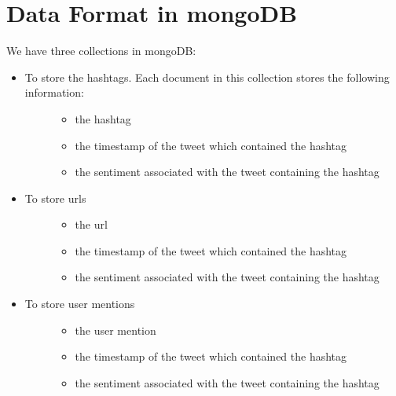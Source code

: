 \documentclass[letterpaper,10pt,english]{sphinxmanual}
\begin{document}
\section{Data Format in mongoDB}
\label{\detokenize{mongoDB_data_ingestion:data-format-in-mongodb}}
We have three collections in mongoDB:
\begin{itemize}
\item {} \begin{description}
\item[{To store the hashtags. Each document in this collection stores the following information:}] \leavevmode\begin{itemize}
\item {} 
the hashtag

\item {} 
the timestamp of the tweet which contained the hashtag

\item {} 
the sentiment associated with the tweet containing the hashtag

\end{itemize}

\end{description}

\item {} \begin{description}
\item[{To store urls}] \leavevmode\begin{itemize}
\item {} 
the url

\item {} 
the timestamp of the tweet which contained the hashtag

\item {} 
the sentiment associated with the tweet containing the hashtag

\end{itemize}

\end{description}

\item {} \begin{description}
\item[{To store user mentions}] \leavevmode\begin{itemize}
\item {} 
the user mention

\item {} 
the timestamp of the tweet which contained the hashtag

\item {} 
the sentiment associated with the tweet containing the hashtag

\end{itemize}

\end{description}

\end{itemize}
\end{document}
